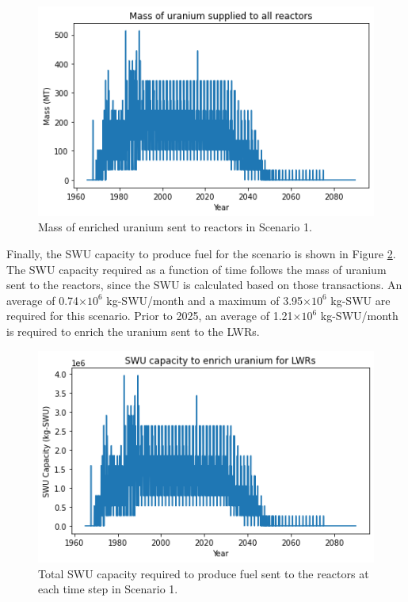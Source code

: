 \begin{figure}
    \centering 
    \includegraphics[width=\textwidth]{../figures/fuelsupply_scenarios_1.png}
    \caption{Mass of enriched uranium sent to reactors in Scenario 1.}
    \label{fig:fuel_1}
\end{figure}

Finally, the \gls{SWU} capacity to produce fuel for the scenario is shown in 
Figure \ref{fig:swu_1}. The \gls{SWU} capacity required as a function of 
time follows the mass of uranium sent to the reactors, since the \gls{SWU}
is calculated based on those transactions. An average of 0.74$\times 10^6$
kg-\gls{SWU}/month and a maximum of 3.95$\times 10^6$ kg-\gls{SWU} are 
required for this scenario. Prior to 2025, an average of 1.21$\times 10^6$ 
kg-\gls{SWU}/month is required to enrich the uranium sent to the \glspl{LWR}.

\begin{figure}
    \centering
    \includegraphics[width=\textwidth]{../figures/totalswu_scenarios_1.png}
    \caption{Total \gls{SWU} capacity required to produce fuel sent to the 
    reactors at each time step in Scenario 1.}
    \label{fig:swu_1}
\end{figure}

